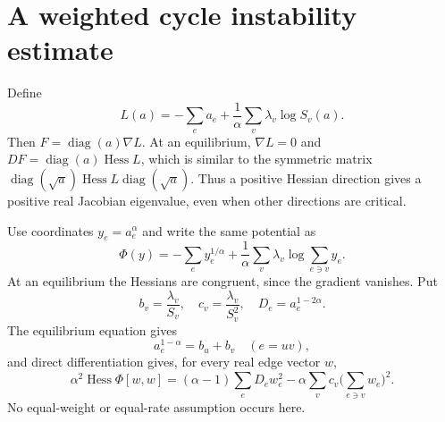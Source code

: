 \documentclass[11pt]{article}
\newcommand{\diag}{\operatorname{diag}}
\newcommand{\Hess}{\operatorname{Hess}}
\begin{document}
\section{A weighted cycle instability estimate}
Define
\[
 L(a)=-\sum_ea_e+\frac1\alpha\sum_v\lambda_v\log S_v(a).
\]
Then $F=\diag(a)\nabla L$. At an equilibrium, $\nabla L=0$ and
$DF=\diag(a)\Hess L$, which is similar to the symmetric matrix
$\diag(\sqrt a)\Hess L\diag(\sqrt a)$. Thus a positive Hessian
direction gives a positive real Jacobian eigenvalue, even when other
directions are critical.

Use coordinates $y_e=a_e^\alpha$ and write the same potential as
\[
 \Phi(y)=-\sum_ey_e^{1/\alpha}
       +\frac1\alpha\sum_v\lambda_v\log\sum_{e\ni v}y_e.
\]
At an equilibrium the Hessians are congruent, since the gradient
vanishes. Put
\[
 b_v=\frac{\lambda_v}{S_v},\quad c_v=\frac{\lambda_v}{S_v^2},
 \quad D_e=a_e^{1-2\alpha}.
\]
The equilibrium equation gives
\begin{equation}\label{eq}
 a_e^{1-\alpha}=b_u+b_v\quad(e=uv),
\end{equation}
and direct differentiation gives, for every real edge vector $w$,
\begin{equation}\label{hess}
 \alpha^2\Hess\Phi[w,w]
  =(\alpha-1)\sum_eD_ew_e^2
     -\alpha\sum_vc_v\Big(\sum_{e\ni v}w_e\Big)^2.
\end{equation}
No equal-weight or equal-rate assumption occurs here.
\end{document}
